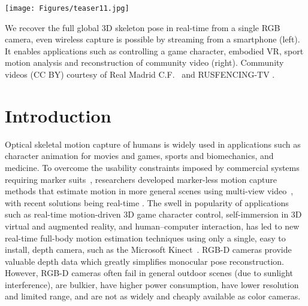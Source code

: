 \documentclass[acmtog]{acmart}
\newcommand{\change}[1]{{#1}}
\begin{document}
\begin{teaserfigure}
 \texttt{[image: Figures/teaser11.jpg]}
   \caption{We recover the full global 3D skeleton pose in real-time from a single RGB camera, even wireless capture is possible by streaming from a smartphone (left). It enables applications such as controlling a game character, embodied VR, sport motion analysis and reconstruction of community video (right). Community videos (CC BY) courtesy of Real Madrid C.F.\  and RUSFENCING-TV .}
   \label{fig:teaser}
\end{teaserfigure}

\maketitle

\vspace{-0.3cm}
\section{Introduction}
Optical skeletal motion capture of humans is widely used in applications such as character animation for movies and games, sports and biomechanics, and medicine. To overcome the usability constraints imposed by commercial systems requiring marker suits~\cite{menache2000understanding}, researchers developed marker-less motion capture methods that estimate motion in more general scenes using multi-view video~\cite{moeslund_survey_2006}, \change{with recent solutions being real-time} \cite{stoll_fast_iccv2011}.
The \change{swell in} popularity of applications such as real-time motion-driven 3D game character control, self-immersion in 3D virtual and augmented reality, and human--computer interaction, has led to new real-time full-body motion estimation techniques using only a single, easy to install, depth camera, such as the Microsoft Kinect~\cite{kinectv1,kinectv2,kinectsdk}.
\mbox{RGB-D} cameras provide valuable depth data which greatly simplifies monocular pose reconstruction.
However, \mbox{RGB-D} cameras often fail in general outdoor scenes \change{(due to sunlight interference)}, are bulkier, have higher power consumption, have lower resolution and limited range, and are not as widely and cheaply available as color cameras.
\end{document}
